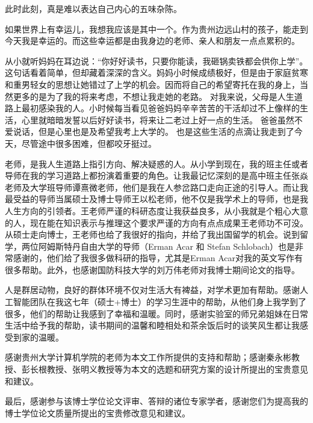 \begin{thanks}
	
此时此刻，真是难以表达自己内心的五味杂陈。

如果世界上有幸运儿，我想我应该是其中一个。作为贵州边远山村的孩子，能走到今天我是幸运的。而这些幸运都是由我身边的老师、亲人和朋友一点点累积的。

从小就听妈妈在耳边说：“你好好读书，只要你能读，我砸锅卖铁都会供你上学”。这句话看着简单，但却藏着深深的含义。妈妈小时候成绩极好，但是由于家庭贫寒和重男轻女的思想让她错过了上学的机会。因而将自己的希望寄托在我的身上，当然更多的是为了我的将来考虑，不想让我走她的老路。
对我来说，父母是人生道路上最初感染我的人。小时候每当看见爸爸妈妈辛辛苦苦的干活却过不上像样的生活，心里就暗暗发誓以后好好读书，将来让二老过上好一点的生活。
爸爸虽然不爱说话，但是心里也是及希望我考上大学的。
也是这些生活的点滴让我走到了今天，尽管途中很多困难，但都咬牙挺过。

老师，是我人生道路上指引方向、解决疑惑的人。从小学到现在，我的班主任或者导师在我的学习道路上都扮演着重要的角色。让我最记忆深刻的是高中班主任张焱老师及大学班导师谭熹微老师，他们是我在人参岔路口走向正途的引导人。而让我最受益的导师当属硕士及博士导师王以松老师，他不仅是我学术上的导师，也是我人生方向的引领者。王老师严谨的科研态度让我获益良多，从小我就是个粗心大意的人，现在能在知识表示与推理这个要求严谨的方向有点点成果王老师功不可没。从硕士走向博士，王老师也给了我很好的指向，并给了我出国留学的机会。说到留学，两位阿姆斯特丹自由大学的导师（Erman Acar 和 Stefan Schlobach）也是非常感谢的，他们给了我很多做科研的指导，尤其是Erman Acar对我的英文写作有很多帮助。此外，也感谢国防科技大学的刘万伟老师对我博士期间论文的指导。

人是群居动物，良好的群体环境不仅对生活大有裨益，对学术更加有帮助。感谢人工智能团队在我这七年（硕士+博士）的学习生涯中的帮助，从他们身上我学到了很多，他们的帮助让我感到了幸福和温暖。同时，感谢实验室的师兄弟姐妹在日常生活中给予我的帮助，读书期间的温馨和睦相处和茶余饭后时的谈笑风生都让我感受到家的温暖。



感谢贵州大学计算机学院的老师为本文工作所提供的支持和帮助；感谢秦永彬教授、彭长根教授、张明义教授等为本文的选题和研究方案的设计所提出的宝贵意见和建议。



最后，感谢参与该博士学位论文评审、答辩的诸位专家学者，感谢您们为提高我的博士学位论文质量所提出的宝贵修改意见和建议。
	
	
\end{thanks}
